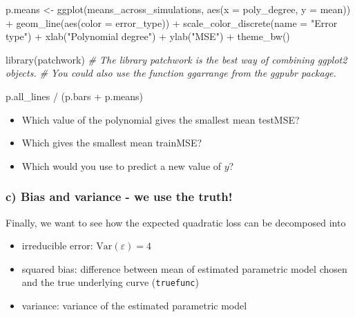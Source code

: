 \documentclass[
]{article}
\newenvironment{Shaded}{\begin{snugshade}}{\end{snugshade}}
\newcommand{\AttributeTok}[1]{\textcolor[rgb]{0.77,0.63,0.00}{#1}}
\newcommand{\CommentTok}[1]{\textcolor[rgb]{0.56,0.35,0.01}{\textit{#1}}}
\newcommand{\FunctionTok}[1]{\textcolor[rgb]{0.00,0.00,0.00}{#1}}
\newcommand{\NormalTok}[1]{#1}
\newcommand{\OtherTok}[1]{\textcolor[rgb]{0.56,0.35,0.01}{#1}}
\newcommand{\SpecialCharTok}[1]{\textcolor[rgb]{0.00,0.00,0.00}{#1}}
\newcommand{\StringTok}[1]{\textcolor[rgb]{0.31,0.60,0.02}{#1}}
\providecommand{\tightlist}{%
  \setlength{\itemsep}{0pt}\setlength{\parskip}{0pt}}
\begin{document}
\begin{Shaded}
\begin{Highlighting}[]
\NormalTok{p.means }\OtherTok{\textless{}{-}} \FunctionTok{ggplot}\NormalTok{(means\_across\_simulations, }\FunctionTok{aes}\NormalTok{(}\AttributeTok{x =}\NormalTok{ poly\_degree, }\AttributeTok{y =}\NormalTok{ mean)) }\SpecialCharTok{+}
  \FunctionTok{geom\_line}\NormalTok{(}\FunctionTok{aes}\NormalTok{(}\AttributeTok{color =}\NormalTok{ error\_type)) }\SpecialCharTok{+}
  \FunctionTok{scale\_color\_discrete}\NormalTok{(}\AttributeTok{name =} \StringTok{"Error type"}\NormalTok{) }\SpecialCharTok{+}
  \FunctionTok{xlab}\NormalTok{(}\StringTok{"Polynomial degree"}\NormalTok{) }\SpecialCharTok{+}
  \FunctionTok{ylab}\NormalTok{(}\StringTok{"MSE"}\NormalTok{) }\SpecialCharTok{+}
  \FunctionTok{theme\_bw}\NormalTok{()}

\FunctionTok{library}\NormalTok{(patchwork) }\CommentTok{\# The library patchwork is the best way of combining ggplot2 objects. }
\CommentTok{\# You could also use the function ggarrange from the ggpubr package.}

\NormalTok{p.all\_lines }\SpecialCharTok{/}\NormalTok{ (p.bars }\SpecialCharTok{+}\NormalTok{ p.means)}
\end{Highlighting}
\end{Shaded}

\begin{itemize}
\tightlist
\item
  Which value of the polynomial gives the smallest mean testMSE?
\item
  Which gives the smallest mean trainMSE?
\item
  Which would you use to predict a new value of \(y\)?
\end{itemize}

\hypertarget{c-bias-and-variance---we-use-the-truth}{%
\subsubsection{c) Bias and variance - we use the
truth!}\label{c-bias-and-variance---we-use-the-truth}}

Finally, we want to see how the expected quadratic loss can be
decomposed into

\begin{itemize}
\tightlist
\item
  irreducible error: \(\text{Var}(\varepsilon)=4\)
\item
  squared bias: difference between mean of estimated parametric model
  chosen and the true underlying curve (\texttt{truefunc})
\item
  variance: variance of the estimated parametric model
\end{itemize}
\end{document}

